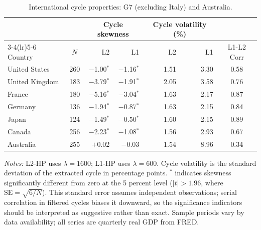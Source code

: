 \documentclass[10pt]{article}
\begin{document}
\begin{table}[htbp]
\centering
\caption{International cycle properties: G7 (excluding Italy) and Australia.}
\label{tab:international}
\begin{tabular}{l c rr rr c}
\toprule
 & & \multicolumn{2}{c}{Cycle skewness} & \multicolumn{2}{c}{Cycle volatility (\%)} & \\
\cmidrule(lr){3-4}\cmidrule(lr){5-6}
Country & $N$ & L2 & L1 & L2 & L1 & L1-L2 Corr \\
\midrule
United States   & 260 & $-$1.00$^{*}$ & $-$1.16$^{*}$ & 1.51 & 3.30 & 0.58 \\
United Kingdom  & 183 & $-$3.79$^{*}$ & $-$1.91$^{*}$ & 2.05 & 3.58 & 0.76 \\
France          & 180 & $-$5.16$^{*}$ & $-$3.04$^{*}$ & 1.63 & 2.17 & 0.87 \\
Germany         & 136 & $-$1.94$^{*}$ & $-$0.87$^{*}$ & 1.63 & 2.15 & 0.84 \\
Japan           & 124 & $-$1.49$^{*}$ & $-$0.50$^{*}$ & 1.60 & 2.15 & 0.89 \\
Canada          & 256 & $-$2.23$^{*}$ & $-$1.08$^{*}$ & 1.56 & 2.93 & 0.67 \\
Australia       & 255 & $+$0.02       & $-$0.03       & 1.54 & 8.96 & 0.34 \\
\bottomrule
\end{tabular}
\begin{tablenotes}
\small
\item \textit{Notes:} L2-HP uses $\lambda=1600$; L1-HP uses $\lambda=600$. Cycle volatility is the standard deviation of the extracted cycle in percentage points. $^{*}$ indicates skewness significantly different from zero at the 5 percent level ($|t| > 1.96$, where $\text{SE} = \sqrt{6/N}$). This standard error assumes independent observations; serial correlation in filtered cycles biases it downward, so the significance indicators should be interpreted as suggestive rather than exact. Sample periods vary by data availability; all series are quarterly real GDP from FRED.
\end{tablenotes}
\end{table}
\end{document}

